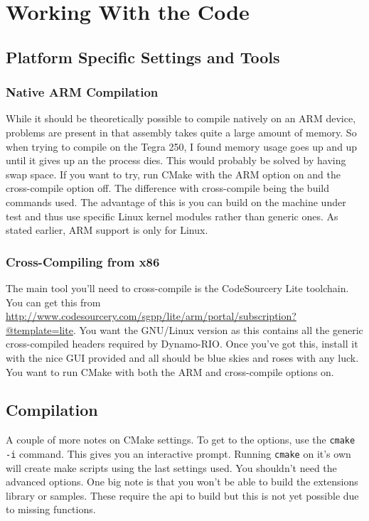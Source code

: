 \documentclass[a4paper]{article}
\begin{document}
\section{Working With the Code}
\subsection{Platform Specific Settings and Tools}
\subsubsection{Native ARM Compilation}
While it should be theoretically possible to compile natively on an ARM device,
problems are present in that assembly takes quite a large amount of memory. So
when trying to compile on the Tegra 250, I found memory usage goes up and up
until it gives up an the process dies. This would probably be solved by having
swap space. If you want to try, run CMake with the ARM option on and the
cross-compile option off. The difference with cross-compile being the build
commands used. The advantage of this is you can build on the machine under test
and thus use specific Linux kernel modules rather than generic ones. As stated
earlier, ARM support is only for Linux.

\subsubsection{Cross-Compiling from x86}
The main tool you'll need to cross-compile is the CodeSourcery Lite toolchain.
You can get this from
\url{http://www.codesourcery.com/sgpp/lite/arm/portal/subscription?@template=lite}.
You want the GNU/Linux version as this contains all the generic cross-compiled
headers required by Dynamo-RIO. Once you've got this, install it with the nice
GUI provided and all should be blue skies and roses with any luck. You want to
run CMake with both the ARM and cross-compile options on. 

\subsection{Compilation}
A couple of more notes on CMake settings. To get to the options, use the
\texttt{cmake -i} command. This gives you an interactive prompt. Running
\texttt{cmake} on it's own will create make scripts using the last settings
used. You shouldn't need the advanced options. One big note is that you won't be
able to build the extensions library or samples. These require the api to build
but this is not yet possible due to missing functions.
\end{document}

